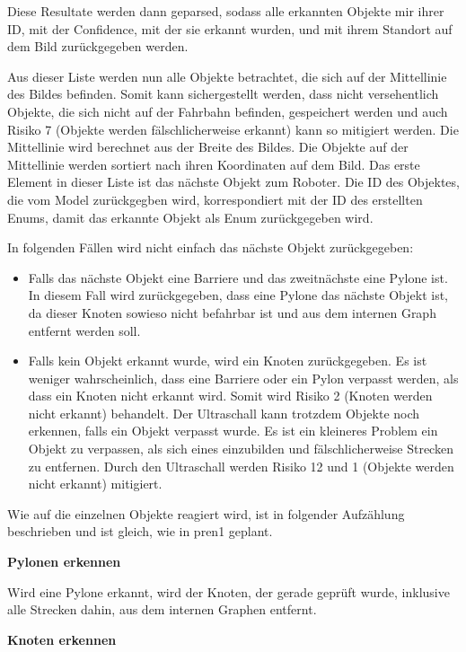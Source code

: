 Diese Resultate werden dann geparsed, sodass alle erkannten Objekte mir ihrer ID, mit der Confidence, mit der sie erkannt wurden, und mit ihrem Standort auf dem Bild zurückgegeben werden.

Aus dieser Liste werden nun alle Objekte betrachtet, die sich auf der Mittellinie des Bildes befinden. Somit kann sichergestellt werden, dass nicht versehentlich Objekte, die sich nicht auf der Fahrbahn befinden, gespeichert werden und auch Risiko 7 (Objekte werden fälschlicherweise erkannt) kann so mitigiert werden. Die Mittellinie wird berechnet aus der Breite des Bildes. Die Objekte auf der Mittellinie werden sortiert nach ihren Koordinaten auf dem Bild. Das erste Element in dieser Liste ist das nächste Objekt zum Roboter. Die ID des Objektes, die vom Model zurückgegben wird, korrespondiert mit der ID des erstellten Enums, damit das erkannte Objekt als Enum zurückgegeben wird.

In folgenden Fällen wird nicht einfach das nächste Objekt zurückgegeben:

\begin{itemize}
    \item Falls das nächste Objekt eine Barriere und das zweitnächste eine Pylone ist. In diesem Fall wird zurückgegeben, dass eine Pylone das nächste Objekt ist, da dieser Knoten sowieso nicht befahrbar ist und aus dem internen Graph entfernt werden soll.
    \item Falls kein Objekt erkannt wurde, wird ein Knoten zurückgegeben. Es ist weniger wahrscheinlich, dass eine Barriere oder ein Pylon verpasst werden, als dass ein Knoten nicht erkannt wird. Somit wird Risiko 2 (Knoten werden nicht erkannt) behandelt. Der Ultraschall kann trotzdem Objekte noch erkennen, falls ein Objekt verpasst wurde. Es ist ein kleineres Problem ein Objekt zu verpassen, als sich eines einzubilden und fälschlicherweise Strecken zu entfernen. Durch den Ultraschall werden Risiko 12 und 1 (Objekte werden nicht erkannt) mitigiert.
\end{itemize}


Wie auf die einzelnen Objekte reagiert wird, ist in folgender Aufzählung beschrieben und ist gleich, wie in \acrshort{pren1} geplant.

\textbf{Pylonen erkennen}

Wird eine Pylone erkannt, wird der Knoten, der gerade geprüft wurde, inklusive alle Strecken dahin, aus dem internen Graphen entfernt.

\textbf{Knoten erkennen}

